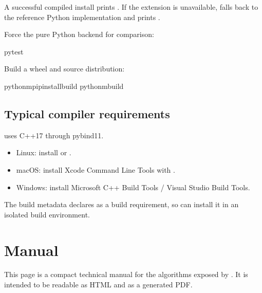 \documentclass[a4paper,11pt,english]{sphinxmanual}
\begin{document}
\sphinxAtStartPar
A successful compiled install prints .  If the extension is unavailable,
 falls back to the reference Python implementation and prints
.

\sphinxAtStartPar
Force the pure Python backend for comparison:

\begin{sphinxVerbatim}[commandchars=\\\{\}]
pytest
\end{sphinxVerbatim}

\sphinxAtStartPar
Build a wheel and source distribution:

\begin{sphinxVerbatim}[commandchars=\\\{\}]
python\PYGZhy{}mpipinstallbuild
python\PYGZhy{}mbuild
\end{sphinxVerbatim}


\section{Typical compiler requirements}
\label{\detokenize{installation:typical-compiler-requirements}}
\sphinxAtStartPar
{} uses C++17 through pybind11.
\begin{itemize}
\item {} 
\sphinxAtStartPar
Linux: install  or .

\item {} 
\sphinxAtStartPar
macOS: install Xcode Command Line Tools with .

\item {} 
\sphinxAtStartPar
Windows: install Microsoft C++ Build Tools / Visual Studio Build Tools.

\end{itemize}

\sphinxAtStartPar
The build metadata declares  as a build requirement, so  can
install it in an isolated build environment.

\sphinxstepscope


\chapter{Manual}
\label{\detokenize{manual:manual}}\label{\detokenize{manual::doc}}
\sphinxAtStartPar
This page is a compact technical manual for the algorithms exposed by
.  It is intended to be readable as HTML and as a generated PDF.
\end{document}
